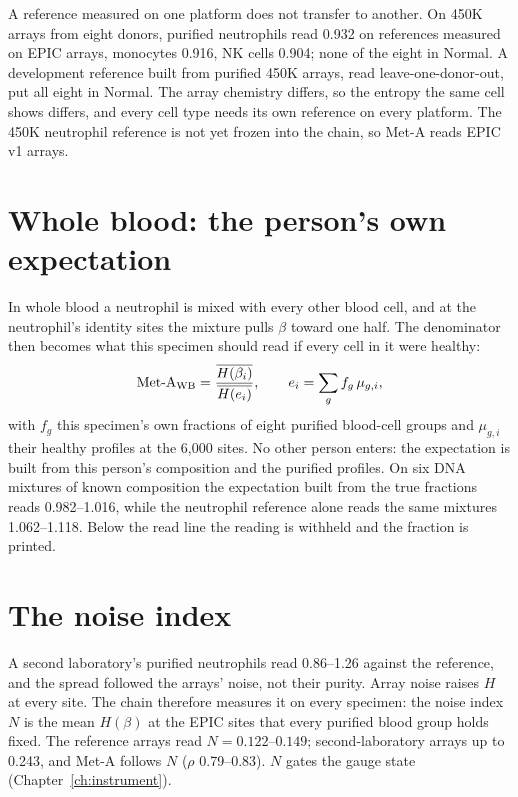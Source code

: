 A reference measured on one platform does not transfer to another. On 450K arrays from eight donors, purified neutrophils
read 0.932 on references measured on EPIC arrays, monocytes 0.916, NK cells 0.904; none of the eight in Normal. A development
reference built from purified 450K arrays, read leave-one-donor-out, put all eight in Normal. \measured{} The
array chemistry differs, so the entropy the same cell shows differs, and every cell type needs its own reference on every
platform. The 450K neutrophil reference is not yet frozen into the chain, so Met-A reads EPIC v1 arrays.

\section{Whole blood: the person's own expectation}

In whole blood a neutrophil is mixed with every other blood cell, and at the neutrophil's identity sites the mixture pulls
$\beta$ toward one half. The denominator then becomes what this specimen should read if every cell in it were healthy:
\begin{equation}
  \text{Met-A}_{\rm WB}=\frac{\overline{H(\beta_i)}}{\overline{H(e_i)}},\qquad e_i=\sum_g f_g\,\mu_{g,i},
  \label{eq:metawb}
\end{equation}
with $f_g$ this specimen's own fractions of eight purified blood-cell groups and $\mu_{g,i}$ their healthy profiles at the
6,000 sites. No other person enters: the expectation is built from this person's
composition and the purified profiles. On six DNA mixtures of known composition the expectation built from the true fractions
reads 0.982--1.016, while the neutrophil reference alone reads the same mixtures 1.062--1.118. \measured{}
Below the read line the reading is withheld and the fraction is printed.

\section{The noise index}

A second laboratory's purified neutrophils read 0.86--1.26 against the reference, and the spread followed the arrays'
noise, not their purity. \measured{} Array noise raises $H$ at every site. The chain therefore measures
it on every specimen: the noise index $N$ is the mean $H(\beta)$ at the EPIC sites that every purified blood group holds
fixed. The reference arrays read $N=0.122$--$0.149$;
second-laboratory arrays up to 0.243, and Met-A follows $N$ ($\rho$ 0.79--0.83). \measured{} $N$ gates the
gauge state (Chapter~\ref{ch:instrument}).

